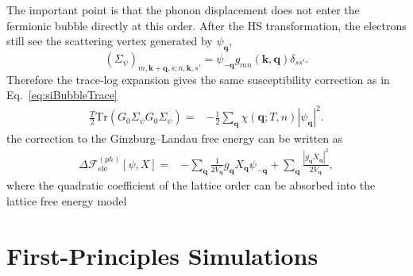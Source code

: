 \documentclass[aps,prl,article,twocolumn,preprintnumbers,amsmath,amssymb,superscriptaddress]{revtex4-2}
\begin{document}
The important point is that the phonon displacement does not enter the
fermionic bubble directly at this order.  After the HS transformation, the
electrons still see the scattering vertex generated by
$\psi_{\mathbf q}$,
\begin{equation}
\left(\Sigma_\psi\right)_{m,\mathbf k+\mathbf q,s;n,\mathbf k,s'}
=
\psi_{-\mathbf q}
g_{mn}(\mathbf k,\mathbf q)
\delta_{ss'} .
\end{equation}
Therefore the trace-log expansion gives the same susceptibility correction
as in Eq.~\eqref{eq:siBubbleTrace}
\begin{align}
\frac{T}{2}
\mathrm{Tr}
\left(
G_0\Sigma_\psi
G_0\Sigma_\psi
\right)
=&
-
\frac{1}{2}
\sum_{\mathbf q}
\chi(\mathbf q;T,n)
|\psi_{\mathbf q}|^2 .
\end{align}
the correction to the Ginzburg--Landau free energy can be written as
\begin{align}
\Delta \mathcal F_{\mathrm{ele}}^{(ph)}[\psi,X]
=
&-
\sum_{\mathbf q}
\frac{1}{2V_{\mathbf q}}
g_{\mathbf q}X_{\mathbf q}\psi_{-\mathbf q}
+
\sum_{\mathbf q}
\frac{|g_{\mathbf q}X_{\mathbf q}|^2}{2V_{\mathbf q}},
\end{align}
where the quadratic coefficient of the lattice order can be absorbed into the lattice free energy model


\section{First-Principles Simulations}\label{app:DFT}





\end{document}
